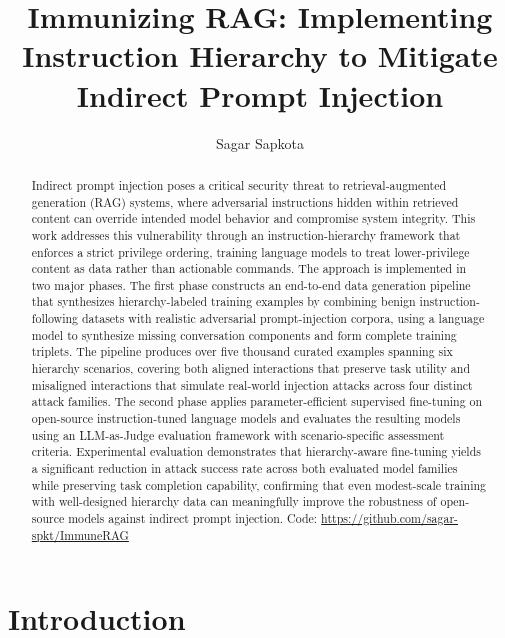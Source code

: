 \documentclass[sigconf]{acmart}
\begin{document}
\title{Immunizing RAG: Implementing Instruction Hierarchy to Mitigate Indirect Prompt Injection}

\author{Sagar Sapkota}

\begin{abstract}
Indirect prompt injection poses a critical security threat to retrieval-augmented generation (RAG) systems, where adversarial instructions hidden within retrieved content can override intended model behavior and compromise system integrity. This work addresses this vulnerability through an instruction-hierarchy framework that enforces a strict privilege ordering, training language models to treat lower-privilege content as data rather than actionable commands. The approach is implemented in two major phases. The first phase constructs an end-to-end data generation pipeline that synthesizes hierarchy-labeled training examples by combining benign instruction-following datasets with realistic adversarial prompt-injection corpora, using a language model to synthesize missing conversation components and form complete training triplets. The pipeline produces over five thousand curated examples spanning six hierarchy scenarios, covering both aligned interactions that preserve task utility and misaligned interactions that simulate real-world injection attacks across four distinct attack families. The second phase applies parameter-efficient supervised fine-tuning on open-source instruction-tuned language models and evaluates the resulting models using an LLM-as-Judge evaluation framework with scenario-specific assessment criteria. Experimental evaluation demonstrates that hierarchy-aware fine-tuning yields a significant reduction in attack success rate across both evaluated model families while preserving task completion capability, confirming that even modest-scale training with well-designed hierarchy data can meaningfully improve the robustness of open-source models against indirect prompt injection.
\newline Code: \url{https://github.com/sagar-spkt/ImmuneRAG}
\end{abstract}

\maketitle
\section{Introduction}
\end{document}
